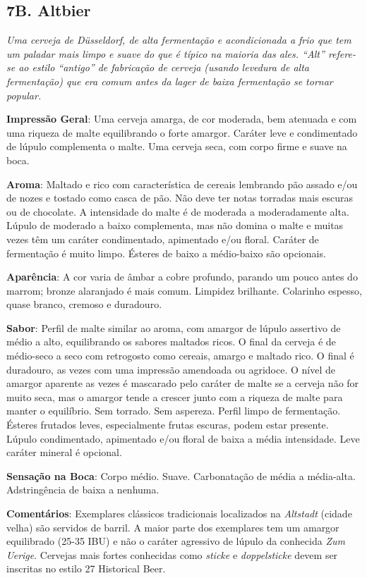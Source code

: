\subsection*{7B. Altbier}
\textit{Uma cerveja de Düsseldorf, de alta fermentação e acondicionada a frio que tem um paladar mais limpo e suave do que é típico na maioria das ales. “Alt” refere-se ao estilo “antigo” de fabricação de cerveja (usando levedura de alta fermentação) que era comum antes da lager de baixa fermentação se tornar popular.}

\textbf{Impressão Geral}: Uma cerveja amarga, de cor moderada, bem atenuada e com uma riqueza de malte equilibrando o forte amargor. Caráter leve e condimentado de lúpulo complementa o malte. Uma cerveja seca, com corpo firme e suave na boca.

\textbf{Aroma}: Maltado e rico com característica de cereais lembrando pão assado e/ou de nozes e tostado como casca de pão. Não deve ter notas torradas mais escuras ou de chocolate. A intensidade do malte é de moderada a moderadamente alta. Lúpulo de moderado a baixo complementa, mas não domina o malte e muitas vezes têm um caráter condimentado, apimentado e/ou floral. Caráter de fermentação é muito limpo. Ésteres de baixo a médio-baixo são opcionais.

\textbf{Aparência}: A cor varia de âmbar a cobre profundo, parando um pouco antes do marrom; bronze alaranjado é mais comum. Limpidez brilhante. Colarinho espesso, quase branco, cremoso e duradouro.

\textbf{Sabor}: Perfil de malte similar ao aroma, com amargor de lúpulo assertivo de médio a alto, equilibrando os sabores maltados ricos. O final da cerveja é de médio-seco a seco com retrogosto como cereais, amargo e maltado rico. O final é duradouro, as vezes com uma impressão amendoada ou agridoce. O nível de amargor aparente as vezes é mascarado pelo caráter de malte se a cerveja não for muito seca, mas o amargor tende a crescer junto com a riqueza de malte para manter o equilíbrio. Sem torrado. Sem aspereza. Perfil limpo de fermentação. Ésteres frutados leves, especialmente frutas escuras, podem estar presente. Lúpulo condimentado, apimentado e/ou floral de baixa a média intensidade. Leve caráter mineral é opcional.

\textbf{Sensação na Boca}: Corpo médio. Suave. Carbonatação de média a média-alta. Adstringência de baixa a nenhuma.

\textbf{Comentários}: Exemplares clássicos tradicionais localizados na \textit{Altstadt} (cidade velha) são servidos de barril. A maior parte dos exemplares tem um amargor equilibrado (25-35 IBU) e não o caráter agressivo de lúpulo da conhecida \textit{Zum Uerige}. Cervejas mais fortes conhecidas como \textit{sticke} e \textit{doppelsticke} devem ser inscritas no estilo 27 Historical Beer.

